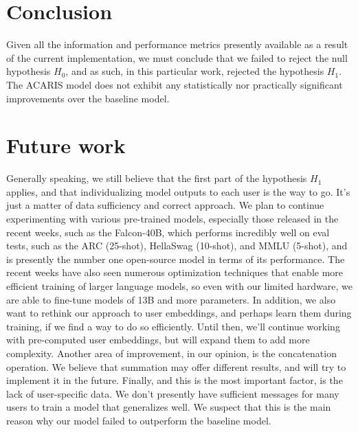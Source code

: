 \documentclass{article}
\begin{document}
\section{Conclusion}
Given all the information and performance metrics presently available as a result of the current implementation, we must conclude that we failed to reject the null hypothesis $H_0$, and as such, in this particular work, rejected the hypothesis $H_1$. The ACARIS model does not exhibit any statistically nor practically significant improvements over the baseline model.

\section{Future work}
Generally speaking, we still believe that the first part of the hypothesis $H_1$ applies, and that individualizing model outputs to each user is the way to go. It's just a matter of data sufficiency and correct approach. We plan to continue experimenting with various pre-trained models, especially those released in the recent weeks, such as the Falcon-40B\cite{falcon40b}, which performs incredibly well on eval tests, such as the ARC (25-shot)\cite{clark2018think}, HellaSwag (10-shot)\cite{zellers2019hellaswag}, and MMLU (5-shot)\cite{hendrycks2021measuring}, and is presently the number one open-source model\cite{open-llm-leaderboard} in terms of its performance. The recent weeks have also seen numerous optimization techniques that enable more efficient training of larger language models, so even with our limited hardware, we are able to fine-tune models of 13B and more parameters. In addition, we also want to rethink our approach to user embeddings, and perhaps learn them during training, if we find a way to do so efficiently. Until then, we'll continue working with pre-computed user embeddings, but will expand them to add more complexity. Another area of improvement, in our opinion, is the concatenation operation. We believe that summation may offer different results, and will try to implement it in the future. Finally, and this is the most important factor, is the lack of user-specific data. We don't presently have sufficient messages for many users to train a model that generalizes well. We suspect that this is the main reason why our model failed to outperform the baseline model.
\newpage

\printbibliography
\end{document}
